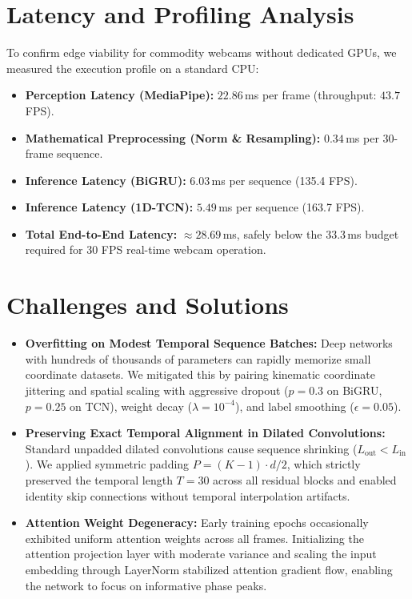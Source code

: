 \documentclass{article}
\begin{document}
\section*{Latency and Profiling Analysis}
To confirm edge viability for commodity webcams without dedicated GPUs, we measured the execution profile on a standard CPU:
\begin{itemize}
    \item \textbf{Perception Latency (MediaPipe):} $22.86$\,ms per frame (throughput: $43.7$\,FPS).
    \item \textbf{Mathematical Preprocessing (Norm \& Resampling):} $0.34$\,ms per 30-frame sequence.
    \item \textbf{Inference Latency (BiGRU):} $6.03$\,ms per sequence (135.4 FPS).
    \item \textbf{Inference Latency (1D-TCN):} $5.49$\,ms per sequence (163.7 FPS).
    \item \textbf{Total End-to-End Latency:} $\approx 28.69$\,ms, safely below the 33.3\,ms budget required for 30 FPS real-time webcam operation.
\end{itemize}

\section*{Challenges and Solutions}
\begin{itemize}
    \item \textbf{Overfitting on Modest Temporal Sequence Batches:}
    Deep networks with hundreds of thousands of parameters can rapidly memorize small coordinate datasets. We mitigated this by pairing kinematic coordinate jittering and spatial scaling with aggressive dropout ($p = 0.3$ on BiGRU, $p = 0.25$ on TCN), weight decay ($\lambda = 10^{-4}$), and label smoothing ($\epsilon = 0.05$).
    
    \item \textbf{Preserving Exact Temporal Alignment in Dilated Convolutions:}
    Standard unpadded dilated convolutions cause sequence shrinking ($L_{\text{out}} < L_{\text{in}}$). We applied symmetric padding $P = (K - 1) \cdot d / 2$, which strictly preserved the temporal length $T = 30$ across all residual blocks and enabled identity skip connections without temporal interpolation artifacts.
    
    \item \textbf{Attention Weight Degeneracy:}
    Early training epochs occasionally exhibited uniform attention weights across all frames. Initializing the attention projection layer with moderate variance and scaling the input embedding through LayerNorm stabilized attention gradient flow, enabling the network to focus on informative phase peaks.
\end{itemize}
\end{document}
